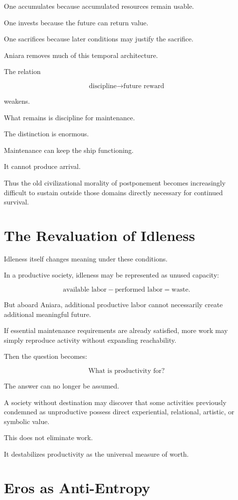 \documentclass[11pt,oneside]{book}
\theoremstyle{definition}
\theoremstyle{remark}
\begin{document}
One accumulates because accumulated resources remain usable.

One invests because the future can return value.

One sacrifices because later conditions may justify the sacrifice.

Aniara removes much of this temporal architecture.

The relation

\[
\text{discipline}
\rightarrow
\text{future reward}
\]

weakens.

What remains is discipline for maintenance.

The distinction is enormous.

Maintenance can keep the ship functioning.

It cannot produce arrival.

Thus the old civilizational morality of postponement becomes increasingly difficult to sustain outside those domains directly necessary for continued survival.

\section{The Revaluation of Idleness}

Idleness itself changes meaning under these conditions.

In a productive society, idleness may be represented as unused capacity:

\[
\text{available labor}
-
\text{performed labor}
=
\text{waste}.
\]

But aboard Aniara, additional productive labor cannot necessarily create additional meaningful future.

If essential maintenance requirements are already satisfied, more work may simply reproduce activity without expanding reachability.

Then the question becomes:

\[
\text{What is productivity for?}
\]

The answer can no longer be assumed.

A society without destination may discover that some activities previously condemned as unproductive possess direct experiential, relational, artistic, or symbolic value.

This does not eliminate work.

It destabilizes productivity as the universal measure of worth.

\section{Eros as Anti-Entropy}
\end{document}
